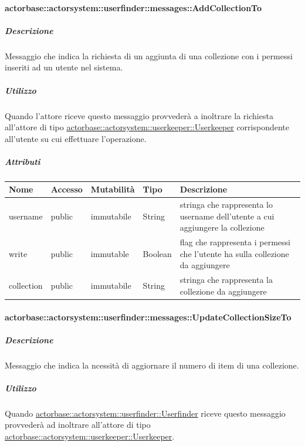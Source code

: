 \documentclass{scalatekids-article}
\begin{document}
\paragraph{actorbase::actorsystem::userfinder::messages::AddCollectionTo}
\label{sec:actorbase::actorsystem::userfinder::messages::AddCollectionTo}

\subparagraph{Descrizione}
Messaggio che indica la richiesta di un aggiunta di una collezione con i permessi inseriti ad un utente nel sistema.

\subparagraph{Utilizzo}
Quando l'attore riceve questo messaggio provvederà a inoltrare la richiesta all'attore di tipo \hyperref[sec:actorbase::actorsystem::userkeeper::Userkeeper]{actorbase::\allowbreak{}actorsystem::\allowbreak{}userkeeper::\allowbreak{}Userkeeper}
corrispondente all'utente su cui effettuare l'operazione.

\subparagraph{Attributi}
\begin{tabular}{| p{3cm} | p{1.5cm} | p{2cm} | p{2cm} | p{8.5cm} |}
  \hline
  Nome & Accesso & Mutabilità & Tipo & Descrizione\\
  \hline
  username & public & immutabile & String & stringa che rappresenta lo username dell'utente a cui aggiungere la collezione \\
  \hline
  write & public & immutable & Boolean & flag che rappresenta i permessi che l'utente ha sulla collezione da aggiungere \\
  \hline
  collection & public & immutabile & String & stringa che rappresenta la collezione da aggiungere \\
  \hline
\end{tabular}

\paragraph{actorbase::actorsystem::userfinder::messages::UpdateCollectionSizeTo}
\label{sec:actorbase::actorsystem::userfinder::messages::UpdateCollectionSizeTo}

\subparagraph{Descrizione}

Messaggio che indica la ncessità di aggiornare il numero di item di una collezione.

\subparagraph{Utilizzo}

Quando \hyperref[sec:actorbase::actorsystem::userfinder::Userfinder]{actorbase::\allowbreak{}actorsystem::\allowbreak{}userfinder::\allowbreak{}Userfinder}
riceve questo messaggio provvederà ad inoltrare all'attore di tipo
\hyperref[sec:actorbase::actorsystem::userkeeper::Userkeeper]{actorbase::\allowbreak{}actorsystem::\allowbreak{}userkeeper::\allowbreak{}Userkeeper}.
\end{document}

